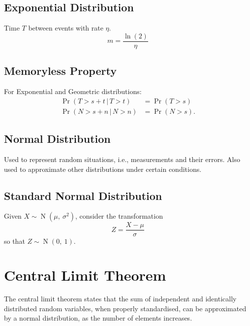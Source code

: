 \documentclass{article}
\begin{document}
\begin{multicols}{3}
    \subsection{Exponential Distribution}
    Time \(T\) between events with rate \(\eta\).
    \begin{equation*}
        m = \frac{\ln{\left( 2 \right)}}{\eta}
    \end{equation*}
    \subsection{Memoryless Property}
    For Exponential and Geometric distributions:
    \begin{align*}
        \Pr{\left( T > s + t \,\vert\, T > t \right)} & = \Pr{\left( T > s \right)}  \\
        \Pr{\left( N > s + n \,\vert\, N > n \right)} & = \Pr{\left( N > s \right)}.
    \end{align*}
    \subsection{Normal Distribution}
    Used to represent random situations, i.e., measurements and their errors.
    Also used to approximate other distributions under certain conditions.
    \subsection{Standard Normal Distribution}
    Given \(X \sim \operatorname{N}{\left( \mu,\: \sigma^2 \right)}\), consider the transformation
    \begin{equation*}
        Z = \frac{X - \mu}{\sigma}
    \end{equation*}
    so that \(Z \sim \operatorname{N}{\left( 0,\: 1 \right)}\). 
    \section{Central Limit Theorem}
    The central limit theorem states that the sum of independent and identically distributed random variables, when properly standardised,
    can be approximated by a normal distribution, as the number of elements increases.

\end{multicols}
\end{document}

